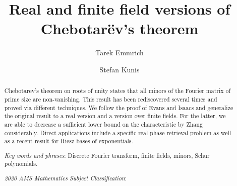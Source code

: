 \documentclass[a4paper]{article}
\title{Real and finite field versions of Chebotar\"ev's theorem}
\author{Tarek Emmrich \and Stefan Kunis}
\date{}
\numberwithin{equation}{section}
\numberwithin{table}{section}
\numberwithin{figure}{section}
\begin{document}
\maketitle

\begin{abstract}
  Chebotarev's theorem on roots of unity states that all minors of the Fourier matrix of prime size are non-vanishing.
  This result has been rediscovered several times and proved via different techniques.
  We follow the proof of Evans and Isaacs and generalize the original result to a real version and a version over finite fields.
  For the latter, we are able to decrease a sufficient lower bound on the characteristic by Zhang considerably.
  Direct applications include a specific real phase retrieval problem as well as a recent result for Riesz bases of exponentials.
  
\medskip
 	\noindent\emph{Key words and phrases}:
    Discrete Fourier transform, finite fields, minors, Schur polynomials.
   
 	\noindent\emph{2020 AMS Mathematics Subject Classification}:
    \text{%
    11T06, %
    15B33,  %
    15B99, %
    43A25, %
    65T50. %
}
\end{abstract}

\end{document}
